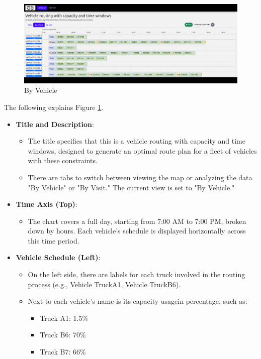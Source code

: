 \documentclass[a4paper,12pt, final]{article}
\begin{document}
\begin{figure}[htbp]
    \centering
    \includegraphics[width=\textwidth]{gfx/VRP_4.png}
    \caption{By Vehicle}
    \label{fig:VRP_4}
\end{figure}
The following explains Figure \ref{fig:VRP_4}.
\begin{itemize}
    \item \textbf{Title and Description}:
        \begin{itemize}
            \item The title specifies that this is a vehicle routing with capacity and time windows, designed to generate an optimal route plan for a fleet of vehicles with these constraints.
            \item There are tabs to switch between viewing the map or analyzing the data "By Vehicle" or "By Visit." The current view is set to "By Vehicle."
        \end{itemize}
    \item \textbf{Time Axis (Top)}:
        \begin{itemize}
            \item The chart covers a full day, starting from 7:00 AM to 7:00 PM, broken down by hours. Each vehicle’s schedule is displayed horizontally across this time period.
        \end{itemize}
    \item \textbf{Vehicle Schedule (Left)}:
    \begin{itemize}
        \item On the left side, there are labels for each truck involved in the routing process (e.g., Vehicle TruckA1, Vehicle TruckB6).
        \item Next to each vehicle's name is its capacity usagein percentage, such as:
            \begin{itemize}
                \item Truck A1: 1.5\%
                \item Truck B6: 70\%
                \item Truck B7: 66\%
            \end{itemize}
    \end{itemize}
\end{itemize}
\newpage
\end{document}
